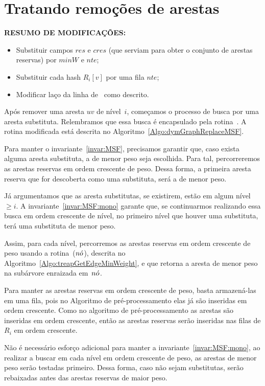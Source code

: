 \section{Tratando remoções de arestas}

\textbf{RESUMO DE MODIFICAÇÕES:}
\begin{itemize}
	\item Substituir campos $res$ e $cres$ (que serviam para obter o conjunto de arestas reservas) por $minW$ e $nte$;
	\item Substituir cada hash $R_i[v]$ por uma fila $nte$;
	\item Modificar laço da linha de~\dymGraphReplaceMSF{} como descrito.
\end{itemize}

Após remover uma aresta $uv$ de nível~$i$, começamos o processo de busca por uma aresta substituta.
Relembramos que essa busca é encapsulado pela rotina~\dymGraphReplace.
A rotina modificada está descrita no Algoritmo~\ref{Algo:dymGraphReplaceMSF}.

Para manter o invariante~\ref{invar:MSF}, precisamos garantir que, caso exista alguma aresta substituta, a de menor peso seja escolhida.
Para tal, percorreremos as arestas reservas em ordem crescente de peso.
Dessa forma, a primeira aresta reserva que for descoberta como uma substituta, será a de menor peso.

Já argumentamos que as aresta substitutas, se existirem, estão em algum nível $\geq i$.
A invariante~\ref{invar:MSF:mono} garante que, se continuarmos realizando essa busca em ordem crescente de nível, no primeiro nível que houver uma substituta, terá uma substituta de menor peso.

Assim, para cada nível, percorremos as arestas reservas em ordem crescente de peso usando a rotina~\treapGetEdgeMinWeight($n\acute{o}$), descrita no Algoritmo~\ref{Algo:treapGetEdgeMinWeight}, e que retorna a aresta de menor peso na subárvore enraizada em~$n\acute{o}$.


Para manter as arestas reservas em ordem crescente de peso, basta armazená-las em uma fila, pois no Algoritmo de pré-processamento elas já são inseridas em ordem crescente.
Como no algoritmo de pré-processamento as arestas são inseridas em ordem crescente, então as arestas reservas serão inseridas nas filas de $R_i$ em ordem crescente.


Não é necessário esforço adicional para manter a invariante~\ref{invar:MSF:mono}, ao realizar a buscar em cada nível em ordem crescente de peso, as arestas de menor peso serão testadas primeiro.
Dessa forma, caso não sejam substitutas, serão rebaixadas antes das arestas reservas de maior peso.

